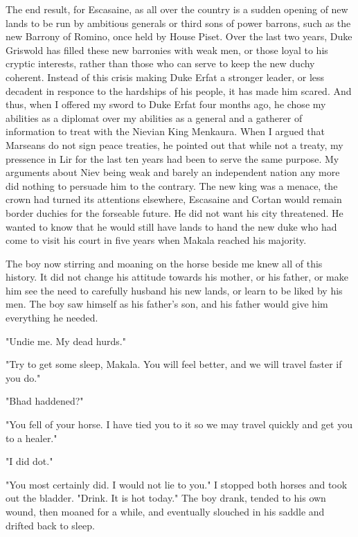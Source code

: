 \documentclass{article}
\begin{document}
The end result, for Escasaine, as all over the country is a sudden opening of new lands to be run by ambitious generals or third sons of power barrons, such as the new Barrony of Romino, once held by House Piset. Over the last two years, Duke Griswold has filled these new barronies with weak men, or those loyal to his cryptic interests, rather than those who can serve to keep the new duchy coherent. Instead of this crisis making Duke Erfat a stronger leader, or less decadent in responce to the hardships of his people, it has made him scared. And thus, when I offered my sword to Duke Erfat four months ago, he chose my abilities as a diplomat over my abilities as a general and a gatherer of information to treat with the Nievian King Menkaura. When I argued that Marseans do not sign peace treaties, he pointed out that while not a treaty, my pressence in Lir for the last ten years had been to serve the same purpose. My arguments about Niev being weak and barely an independent nation any more did nothing to persuade him to the contrary. The new king was a menace, the crown had turned its attentions elsewhere, Escasaine and Cortan would remain border duchies for the forseable future. He did not want his city threatened. He wanted to know that he would still have lands to hand the new duke who had come to visit his court in five years when Makala reached his majority.

The boy now stirring and moaning on the horse beside me knew all of this history. It did not change his attitude towards his mother, or his father, or make him see the need to carefully husband his new lands, or learn to be liked by his men. The boy saw himself as his father's son, and his father would give him everything he needed. 

"Undie me. My dead hurds."

"Try to get some sleep, Makala. You will feel better, and we will travel faster if you do."

"Bhad haddened?"

"You fell of your horse. I have tied you to it so we may travel quickly and get you to a healer."

"I did dot."

"You most certainly did. I would not lie to you." I stopped both horses and took out the bladder. "Drink. It is hot today." The boy drank, tended to his own wound, then moaned for a while, and eventually slouched in his saddle and drifted back to sleep.
\end{document}
